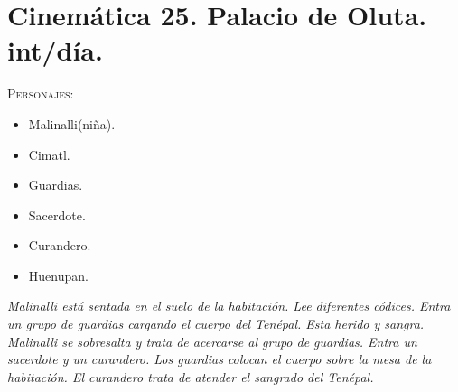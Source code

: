 \documentclass[11pt,letterpaper]{article}
\begin{document}
\section{Cinemática 25. Palacio de Oluta. int/día.}
 \textsc{Personajes}:
 \begin{itemize}
 \item Malinalli(niña).
 \item Cimatl.
\item Guardias.
\item Sacerdote.
\item Curandero.
\item Huenupan.
 \end{itemize}
 \textit{Malinalli está sentada en el suelo de la habitación. Lee diferentes códices. Entra un grupo de guardias cargando el cuerpo del Tenépal. Esta herido y sangra. Malinalli se sobresalta y trata de acercarse al grupo de guardias. Entra un sacerdote y un curandero. Los guardias colocan el cuerpo sobre la mesa de la habitación. El curandero trata de atender el sangrado del Tenépal.}
\end{document}
